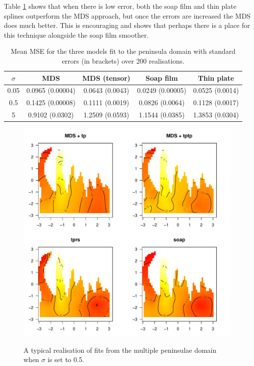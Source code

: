 \documentclass[a4paper,10pt]{article}
\begin{document}
Table \ref{wt2resultstable} shows that when there is low error, both the soap film and thin plate splines outperform the MDS approach, but once the errors are increased the MDS does much better. This is encouraging and shows that perhaps there is a place for this technique alongside the soap film smoother.

\begin{table}[ht]
\centering
\begin{tabular}{c || c c c c}
$\sigma$ & MDS & MDS (tensor) & Soap film & Thin plate\\ 
\hline
0.05 & 0.0965 (0.00004) & 0.0643 (0.0043) & 0.0249 (0.00005) & 0.0525 (0.0014)\\ 
0.5 & 0.1425 (0.00008) & 0.1111 (0.0019) & 0.0826 (0.0064) & 0.1128 (0.0017)\\ 
5 & 0.9102 (0.0302) & 1.2509 (0.0593) & 1.1544 (0.0385) & 1.3853 (0.0304)\\ 
\end{tabular}
\caption{Mean MSE for the three models fit to the peninsula domain with standard errors (in brackets) over 200 realisations.}
\label{wt2resultstable}
\end{table}

\begin{figure}
\centering
\includegraphics[width=6in]{figs/wt2-fit-05.pdf} \\
\caption{A typical realisation of fits from the multiple peninsulae domain when $\sigma$ is set to 0.5.}
\label{wt2-fit-0.5}
\end{figure}
\end{document}
